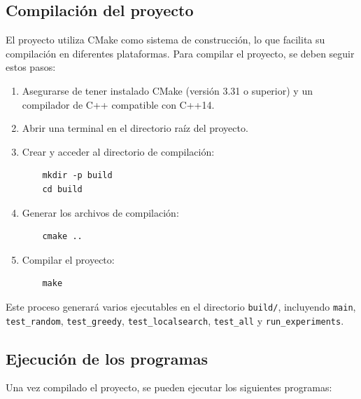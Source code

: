 \documentclass{article}
\begin{document}
\subsection{Compilación del proyecto}

El proyecto utiliza CMake como sistema de construcción, lo que facilita su compilación en diferentes plataformas. Para compilar el proyecto, se deben seguir estos pasos:

\begin{enumerate}
    \item Asegurarse de tener instalado CMake (versión 3.31 o superior) y un compilador de C++ compatible con C++14.
    \item Abrir una terminal en el directorio raíz del proyecto.
    \item Crear y acceder al directorio de compilación:
    \begin{verbatim}
    mkdir -p build
    cd build
    \end{verbatim}
    \item Generar los archivos de compilación:
    \begin{verbatim}
    cmake ..
    \end{verbatim}
    \item Compilar el proyecto:
    \begin{verbatim}
    make
    \end{verbatim}
\end{enumerate}

Este proceso generará varios ejecutables en el directorio \texttt{build/}, incluyendo \texttt{main}, \texttt{test\_random}, \texttt{test\_greedy}, \texttt{test\_localsearch}, \texttt{test\_all} y \texttt{run\_experiments}.

\subsection{Ejecución de los programas}

Una vez compilado el proyecto, se pueden ejecutar los siguientes programas:
\end{document}

